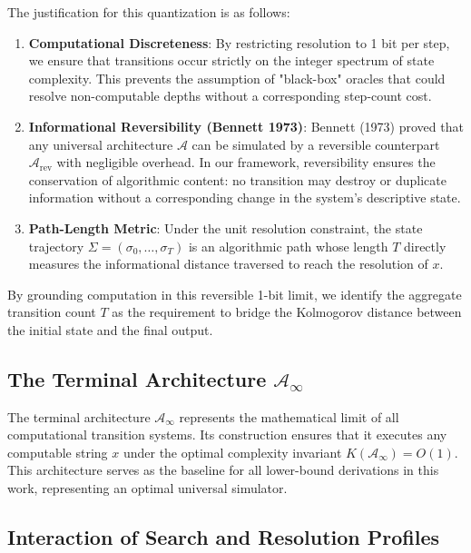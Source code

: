 \documentclass[12pt,a4paper]{article}
\theoremstyle{plain}
\theoremstyle{definition}
\begin{document}
The justification for this quantization is as follows:
\begin{enumerate}
    \item \textbf{Computational Discreteness}: By restricting resolution to 1 bit per step, we 
    ensure that transitions occur strictly on the integer spectrum of state complexity. This 
    prevents the assumption of "black-box" oracles that could resolve non-computable depths 
    without a corresponding step-count cost.
    \item \textbf{Informational Reversibility (Bennett 1973)}: Bennett (1973) proved that any 
    universal architecture $\mathcal{A}$ can be simulated by a reversible counterpart 
    $\mathcal{A}_{\text{rev}}$ with negligible overhead. In our framework, reversibility 
    ensures the conservation of algorithmic content: no transition may destroy or duplicate 
    information without a corresponding change in the system's descriptive state.
    \item \textbf{Path-Length Metric}: Under the unit resolution constraint, the state 
    trajectory $\Sigma = (\sigma_0, \dots, \sigma_T)$ is an algorithmic path whose length $T$ 
    directly measures the informational distance traversed to reach the resolution of $x$.
\end{enumerate}

By grounding computation in this reversible 1-bit limit, we identify the aggregate transition 
count $T$ as the requirement to bridge the Kolmogorov distance between the initial state 
and the final output.

\subsection{The Terminal Architecture $\mathcal{A}_\infty$}

The terminal architecture $\mathcal{A}_\infty$ represents the mathematical limit of all 
computational transition systems. Its construction ensures that it executes any computable 
string $x$ under the optimal complexity invariant $K(\mathcal{A}_\infty) = O(1)$. This 
architecture serves as the baseline for all lower-bound derivations in this work, 
representing an optimal universal simulator.

\subsection{Interaction of Search and Resolution Profiles}
\end{document}
